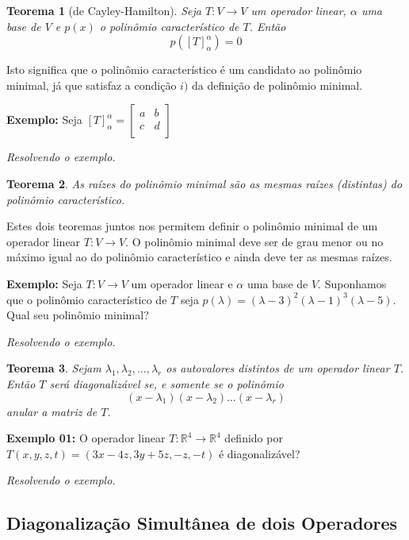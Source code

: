 \documentclass[oneside,a4paper,12pt]{article}
\newtheorem{theorem}{Teorema}[section]
\begin{document}
\begin{theorem}[de Cayley-Hamilton]
	Seja $T:V \rightarrow V$ um operador linear, $\alpha$ uma base de $V$ e $p(x)$ o polinômio característico de $T$. Então
	$$p([T]_{\alpha}^{\alpha}) = 0$$
\end{theorem}
Isto significa que o polinômio característico é um candidato ao polinômio minimal, já que satisfaz a condição $i)$ da definição de polinômio minimal.

{\bf Exemplo: } Seja $[T]^{\alpha}_{\alpha} = \left[
\begin{array}{cc}
a	&	b	\\
c	&	d	 \\
\end{array}
\right]$

\vspace{50pt}
\emph{Resolvendo o exemplo.}

\begin{theorem}
	As raízes do polinômio minimal são as mesmas raízes (distintas) do polinômio característico.
\end{theorem}

Estes dois teoremas juntos nos permitem definir o polinômio minimal de um operador linear $T:V \rightarrow V$. O polinômio minimal deve ser de grau menor ou no máximo igual ao do polinômio característico e ainda deve ter as mesmas raízes.

{\bf Exemplo: } Seja $T:V \rightarrow V$ um operador linear e $\alpha$ uma base de $V$. Suponhamos que o polinômio característico de $T$ seja $p(\lambda) = (\lambda - 3)^2(\lambda -1)^3(\lambda - 5)$. Qual seu polinômio minimal?

\vspace{50pt}
\emph{Resolvendo o exemplo.}


\begin{theorem}
	Sejam $\lambda_1,\lambda_2,\dots, \lambda_r$ os autovalores distintos de um operador linear $T$. Então $T$ será diagonalizável se, e somente se o polinômio
	$$(x - \lambda_1)(x-\lambda_2)\dots(x - \lambda_r)$$
	anular a matriz de $T$.
\end{theorem}

{\bf Exemplo 01: } O operador linear $T:\mathbb{R}^4 \rightarrow \mathbb{R}^4$ definido por $T(x,y,z,t) = (3x-4z,3y+5z,-z,-t)$ é diagonalizável?

\vspace{50pt}
\emph{Resolvendo o exemplo.}

\subsection{Diagonalização Simultânea de dois Operadores}
\end{document}
